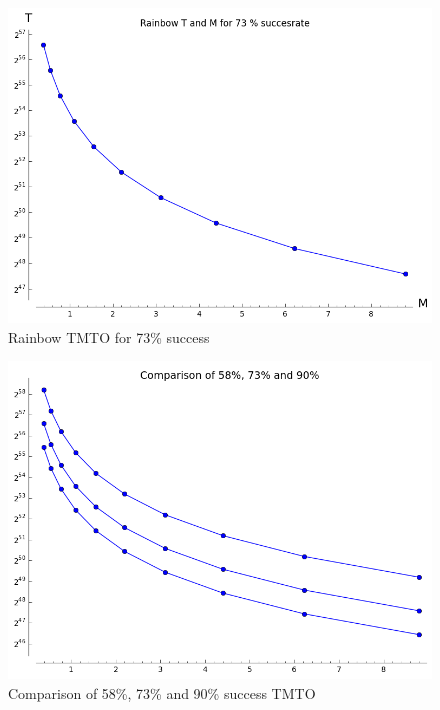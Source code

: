 \begin{figure}[H]
  \centering
  \includegraphics[scale=0.5]{figures/RainbowTime73.png}
  \caption{Rainbow TMTO for 73\% success}

\end{figure}

\begin{figure}[H]
  \centering
  \includegraphics[scale=0.4]{figures/RainbowAllCalc.png}
  \caption{Comparison of 58\%, 73\% and 90\% success TMTO}
  \label{fig:comparisonrain}
\end{figure}

